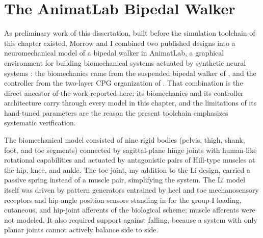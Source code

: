 \section{The AnimatLab Bipedal Walker}\label{sec:prior_walker}

As preliminary work of this dissertation, built before the simulation toolchain of this chapter existed, Morrow and I combined two published designs into a neuromechanical model of a bipedal walker in AnimatLab, a graphical environment for building biomechanical systems actuated by synthetic neural systems \citep{cofer_animatlab_2010}: the biomechanics came from the suspended bipedal walker of \citet{li_bipedal_2017}, and the controller from the two-layer CPG organization of \citet{deng_neuromechanical_2019}. That combination is the direct ancestor of the work reported here: its biomechanics and its controller architecture carry through every model in this chapter, and the limitations of its hand-tuned parameters are the reason the present toolchain emphasizes systematic verification.

The biomechanical model consisted of nine rigid bodies (pelvis, thigh, shank, foot, and toe segments) connected by sagittal-plane hinge joints with human-like rotational capabilities and actuated by antagonistic pairs of Hill-type muscles at the hip, knee, and ankle. The toe joint, my addition to the Li design, carried a passive spring instead of a muscle pair, simplifying the system. The Li model itself was driven by pattern generators entrained by heel and toe mechanosensory receptors and hip-angle position sensors standing in for the group-I loading, cutaneous, and hip-joint afferents of the biological scheme; muscle afferents were not modeled. It also required support against falling, because a system with only planar joints cannot actively balance side to side.

